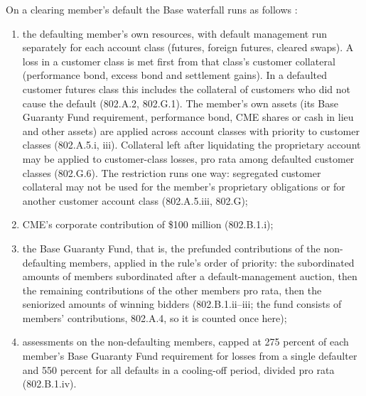 \begin{qfmechanism}
On a clearing member's default the Base waterfall runs as follows \citep[Rules~802.A--802.B]{cme-rulebook-ch8}:
\begin{enumerate}
\item the defaulting member's own resources, with default management run separately for each account class (futures, foreign futures, cleared swaps). A loss in a customer class is met first from that class's customer collateral (performance bond, excess bond and settlement gains). In a defaulted customer futures class this includes the collateral of customers who did not cause the default (802.A.2, 802.G.1). The member's own assets (its Base Guaranty Fund requirement, performance bond, CME shares or cash in lieu and other assets) are applied across account classes with priority to customer classes (802.A.5.i, iii). Collateral left after liquidating the proprietary account may be applied to customer-class losses, pro rata among defaulted customer classes (802.G.6). The restriction runs one way: segregated customer collateral may not be used for the member's proprietary obligations or for another customer account class (802.A.5.iii, 802.G);
\item CME's corporate contribution of \$100 million (802.B.1.i);
\item the Base Guaranty Fund, that is, the prefunded contributions of the non-defaulting members, applied in the rule's order of priority: the subordinated amounts of members subordinated after a default-management auction, then the remaining contributions of the other members pro rata, then the seniorized amounts of winning bidders (802.B.1.ii--iii; the fund consists of members' contributions, 802.A.4, so it is counted once here);
\item assessments on the non-defaulting members, capped at 275 percent of each member's Base Guaranty Fund requirement for losses from a single defaulter and 550 percent for all defaults in a cooling-off period, divided pro rata (802.B.1.iv).
\end{enumerate}


\end{qfmechanism}
